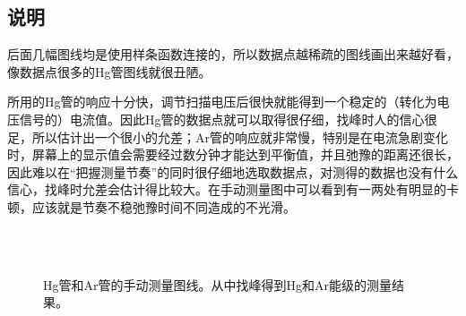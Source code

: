 \documentclass[UTF8]{ctexart}
\begin{document}
\subsection{说明}
后面几幅图线均是使用样条函数连接的，所以数据点越稀疏的图线画出来越好看，像数据点很多的Hg管图线就很丑陋。

所用的Hg管的响应十分快，调节扫描电压后很快就能得到一个稳定的（转化为电压信号的）电流值。因此Hg管的数据点就可以取得很仔细，找峰时人的信心很足，所以估计出一个很小的允差；Ar管的响应就非常慢，特别是在电流急剧变化时，屏幕上的显示值会需要经过数分钟才能达到平衡值，并且弛豫的距离还很长，因此难以在“把握测量节奏”的同时很仔细地选取数据点，对测得的数据也没有什么信心，找峰时允差会估计得比较大。在手动测量图中可以看到有一两处有明显的卡顿，应该就是节奏不稳弛豫时间不同造成的不光滑。
\begin{figure}
  \centering
  \\
  \\
  \caption{Hg管和Ar管的手动测量图线。从中找峰得到Hg和Ar能级的测量结果。}
\end{figure}
\end{document}
